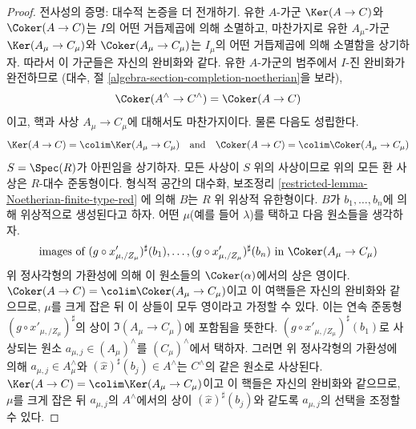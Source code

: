 \begin{proof}
\medskip\noindent
전사성의 증명: 대수적 논증을 더 전개하기.
유한 $A$-가군 $\Ker(A \to C)$와 $\Coker(A \to C)$는
$I$의 어떤 거듭제곱에 의해 소멸하고, 마찬가지로 유한 $A_\mu$-가군
$\Ker(A_\mu \to C_\mu)$와 $\Coker(A_\mu \to C_\mu)$는
$I_\mu$의 어떤 거듭제곱에 의해 소멸함을 상기하자.
따라서 이 가군들은 자신의 완비화와 같다.
유한 $A$-가군의 범주에서 $I$-진 완비화가 완전하므로
(대수, 절 \ref{algebra-section-completion-noetherian}을 보라),
$$
\Coker(A^\wedge \to C^\wedge) = \Coker(A \to C)
$$
이고, 핵과 사상 $A_\mu \to C_\mu$에 대해서도 마찬가지이다.
물론 다음도 성립한다.
$$
\Ker(A \to C) = \colim \Ker(A_\mu \to C_\mu)
\quad\text{and}\quad
\Coker(A \to C) = \colim \Coker(A_\mu \to C_\mu)
$$
$S = \Spec(R)$가 아핀임을 상기하자. 모든 사상이 $S$ 위의 사상이므로
위의 모든 환 사상은 $R$-대수 준동형이다.
형식적 공간의 대수화, 보조정리
\ref{restricted-lemma-Noetherian-finite-type-red}
에 의해 $B$는 $R$ 위 위상적 유한형이다.
$B$가 $b_1, \ldots, b_n$에 의해 위상적으로 생성된다고 하자.
어떤 $\mu$(예를 들어 $\lambda$)를 택하고 다음 원소들을 생각하자.
$$
\text{images of }
(g \circ x'_{\mu, /Z_\mu})^\sharp(b_1)
, \ldots,
(g \circ x'_{\mu, /Z_\mu})^\sharp(b_n)
\text{ in }\Coker(A_\mu \to C_\mu)
$$
위 정사각형의 가환성에 의해 이 원소들의 $\Coker(\alpha)$에서의 상은
영이다. $\Coker(A \to C) = \colim \Coker(A_\mu \to C_\mu)$이고
이 여핵들은 자신의 완비화와 같으므로, $\mu$를 크게 잡은 뒤 이 상들이
모두 영이라고 가정할 수 있다. 이는 연속 준동형
$(g \circ x'_{\mu, /Z_\mu})^\sharp$의 상이
$\Im(A_\mu \to C_\mu)$에 포함됨을 뜻한다.
$(g \circ x'_{\mu, /Z_\mu})^\sharp(b_1)$로 사상되는
원소 $a_{\mu, j} \in (A_\mu)^\wedge$를 $(C_\mu)^\wedge$에서 택하자.
그러면 위 정사각형의 가환성에 의해
$a_{\mu, j} \in A_\mu^\wedge$와 $(\hat x)^\sharp(b_j) \in A^\wedge$는
$C^\wedge$의 같은 원소로 사상된다.
$\Ker(A \to C) = \colim \Ker(A_\mu \to C_\mu)$이고 이 핵들은
자신의 완비화와 같으므로, $\mu$를 크게 잡은 뒤 $a_{\mu, j}$의
$A^\wedge$에서의 상이 $(\hat x)^\sharp(b_j)$와 같도록
$a_{\mu, j}$의 선택을 조정할 수 있다.


\end{proof}
